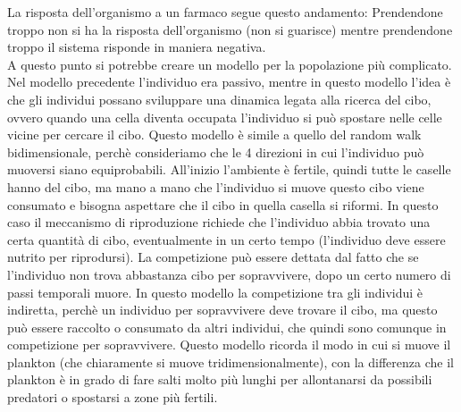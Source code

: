 \documentclass[12pt]{article}
\begin{document}
La risposta dell'organismo a un farmaco segue questo andamento: Prendendone troppo non si ha la risposta dell'organismo (non si guarisce) mentre prendendone troppo il sistema risponde in maniera negativa. \\
A questo punto si potrebbe creare un modello per la popolazione più complicato. Nel modello precedente l'individuo era passivo, mentre in questo modello l'idea è che gli individui possano sviluppare una dinamica legata alla ricerca del cibo, ovvero quando una cella diventa occupata l'individuo si può spostare nelle celle vicine per cercare il cibo. Questo modello è simile a quello del random walk bidimensionale, perchè consideriamo che le 4 direzioni in cui l'individuo può muoversi siano equiprobabili. All'inizio l'ambiente è fertile, quindi tutte le caselle hanno del cibo, ma mano a mano che l'individuo si muove questo cibo viene consumato e bisogna aspettare che il cibo in quella casella si riformi. In questo caso il meccanismo di riproduzione richiede che l'individuo abbia trovato una certa quantità di cibo, eventualmente in un certo tempo (l'individuo deve essere nutrito per riprodursi). La competizione può essere dettata dal fatto che se l'individuo non trova abbastanza cibo per sopravvivere, dopo un certo numero di passi temporali muore. In questo modello la competizione tra gli individui è indiretta, perchè un individuo per sopravvivere deve trovare il cibo, ma questo può essere raccolto o consumato da altri individui, che quindi sono comunque in competizione per sopravvivere. Questo modello ricorda il modo in cui si muove il plankton (che chiaramente si muove tridimensionalmente), con la differenza che il plankton è in grado di fare salti molto più lunghi per allontanarsi da possibili predatori o spostarsi a zone più fertili.  
\end{document}
